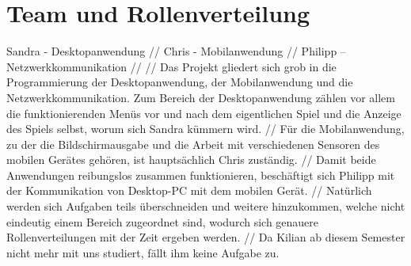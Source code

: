 \section{Team und Rollenverteilung}

Sandra - Desktopanwendung //
Chris - Mobilanwendung //
Philipp – Netzwerkkommunikation //
//
Das Projekt gliedert sich grob in die Programmierung der Desktopanwendung, der Mobilanwendung und die Netzwerkkommunikation. 
Zum Bereich der Desktopanwendung zählen vor allem die funktionierenden Menüs vor und nach dem eigentlichen Spiel und die Anzeige des Spiels selbst, worum sich Sandra kümmern wird.
//
Für die Mobilanwendung, zu der die Bildschirmausgabe und die Arbeit mit verschiedenen Sensoren des mobilen Gerätes gehören, ist hauptsächlich Chris zuständig.
//
Damit beide Anwendungen reibungslos zusammen funktionieren, beschäftigt sich Philipp mit der Kommunikation von Desktop-PC mit dem mobilen Gerät.
//
Natürlich werden sich Aufgaben teils überschneiden und weitere hinzukommen, welche nicht eindeutig einem Bereich zugeordnet sind, wodurch sich genauere Rollenverteilungen mit der Zeit ergeben werden.
//
Da Kilian ab diesem Semester nicht mehr mit uns studiert, fällt ihm keine Aufgabe zu.

